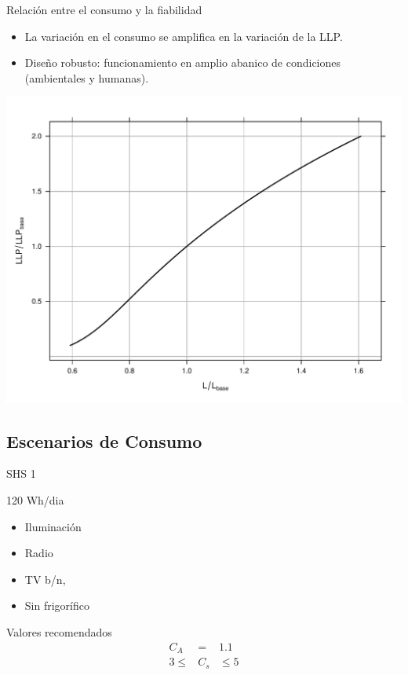 \documentclass[xcolor={usenames,svgnames,dvipsnames}]{beamer}
\begin{document}
\begin{frame}[label={sec:org0c0eb92}]{Relación entre el consumo y la fiabilidad}
\begin{itemize}
\item La variación en el consumo se amplifica en la variación de la LLP.
\item \alert{Diseño robusto}: funcionamiento en amplio abanico de condiciones (ambientales y humanas).
\end{itemize}
\begin{center}
\includegraphics[height=0.7\textheight]{../figs/ConsumoLLP.pdf}
\end{center}
\end{frame}

\subsection{Escenarios de Consumo}
\label{sec:orgb91c376}
\begin{frame}[label={sec:orgf8c9aa5}]{SHS 1}
\begin{block}{120 Wh/dia}
\begin{itemize}
\item Iluminación

\item Radio

\item TV b/n,

\item Sin frigorífico
\end{itemize}
\end{block}

\begin{block}{Valores recomendados}
$$\begin{aligned}
C_{A} & = & 1.1\\
3\leq & C_{s} & \leq5
\end{aligned}$$
\end{block}
\end{frame}
\end{document}

